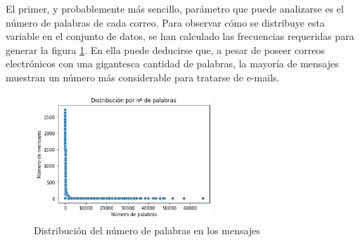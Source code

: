 El primer, y probablemente más sencillo, parámetro que puede analizarse es el número de palabras de cada correo. Para observar cómo se distribuye esta variable en el conjunto de datos, se han calculado las frecuencias requeridas para generar la figura \ref{fig:distpal}. En ella puede deducirse que, a pesar de poseer correos electrónicos con una gigantesca cantidad de palabras, la mayoría de mensajes muestran un número más considerable para tratarse de e-mails.

\begin{figure}[h]
	\centering%
	\centerline{\includegraphics[width = 0.6\textwidth]{Imagenes/Bitmap/dist-palabras.png}}%
	\caption{Distribución del número de palabras en los mensajes}%
	\label{fig:distpal}
\end{figure}